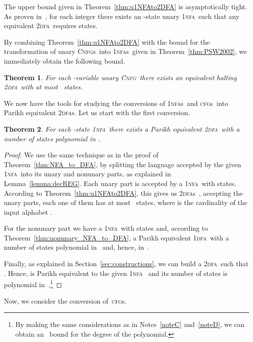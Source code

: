 \documentclass[11pt]{article}
\newcommand*{\tw}{\textsc{2}}
\newcommand*{\twdfa}{\tw\textsc{dfa}}
\newcommand*{\twdfas}{\tw\textsc{dfa}s}
\newcommand*{\ow}{\textsc{1}}
\newcommand*{\owdfa}{\ow\textsc{dfa}}
\newcommand*{\ownfa}{\ow\textsc{nfa}}
\newcommand*{\ownfas}{\ow\textsc{nfa}s}
\newcommand*{\cfgs}{\textsc{cfg}s}
\newcommand*{\cnfg}{\textsc{Cnfg}}
\newcommand*{\cnfgs}{\textsc{Cnfg}s}
\newtheorem{theorem}{Theorem}[section]
\begin{document}
{The upper bound given in Theorem~\ref{thm:u1NFAto2DFA} is asymptotically tight. As proven in~\cite[Thm.~6.3]{Chrobak1986},
for each integer  there exists an -state unary \ownfa\ such that any equivalent \twdfa\ requires
 states.

\medskip

By combining Theorem~\ref{thm:u1NFAto2DFA} with the bound for the transformation of
unary \cnfgs\ into \ownfas\ given in Theorem~\ref{thm:PSW2002}, we immediately obtain the
following bound.

\begin{theorem}\label{thm:uCFGto2DFA}
  For each  -variable unary \cnfg\ there exists an equivalent halting \twdfa\ with 
  at most~ states.
\end{theorem}

We now have the tools for studying the conversions of \ownfas\ and \cfgs\ into Parikh equivalent \twdfas.
Let us start with the first conversion.

\begin{theorem}\label{thm:1NFAto2DFA}
  For each -state \ownfa\ there exists a Parikh equivalent \twdfa\ with a number of states polynomial in .
\end{theorem}
\begin{proof}
  We use the same technique as in the proof of Theorem~\ref{thm:NFA_to_DFA}, by splitting the language accepted
  by the given \ownfa\  into its unary and nonunary parts, as explained in Lemma~\ref{lemma:decREG}. 
  Each unary part is accepted by a \ownfa\ with 
   states. According to Theorem~\ref{thm:u1NFAto2DFA}, this gives us  \twdfas\ ,
  accepting the unary parts, each one
  of them has at most~ states, where  is the cardinality of the input alphabet
  .
    
  For the nonunary part we have a \ownfa\ with  states and, according to Theorem~\ref{thm:nonunary_NFA_to_DFA},
  a Parikh equivalent \owdfa\  with a number of states polynomial in~ and, hence, in~.
  
  Finally, as explained in Section~\ref{sec:constructions}, we can build a \twdfa\  such that 
  .
  Hence,  is Parikh equivalent to the given \ownfa~ and its number of states is polynomial in~.\footnote{By making the same considerations as in Notes~\ref{noteC} and~\ref{noteD}, we can obtain an~
  bound for the degree of the polynomial.}
\end{proof}


Now, we consider the conversion of~\cfgs.

}
\end{document}
